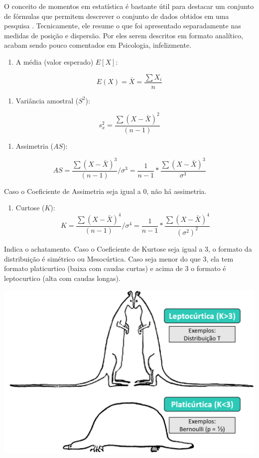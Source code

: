 \documentclass[
]{book}
\providecommand{\tightlist}{%
  \setlength{\itemsep}{0pt}\setlength{\parskip}{0pt}}
\begin{document}
O conceito de momentos em estatística é bastante útil para destacar um conjunto de fórmulas que permitem descrever o conjunto de dados obtidos em uma pesquisa \citep{JenkinsSmith2017}. Tecnicamente, ele resume o que foi apresentado separadamente nas medidas de posição e dispersão. Por eles serem descritos em formato analítico, acabam sendo pouco comentados em Psicologia, infelizmente.

\begin{enumerate}
\def\labelenumi{\arabic{enumi}.}
\tightlist
\item
  A média (valor esperado) \(E[X]\):
\end{enumerate}

\[E(X) = \bar{X}=\frac{\sum X_{i}}{n}\]

\begin{enumerate}
\def\labelenumi{\arabic{enumi}.}
\setcounter{enumi}{1}
\tightlist
\item
  Variância amostral (\(S^2\)):
\end{enumerate}

\[s^{2}_{x}=\frac{\sum (X-\bar{X})^{2}}{(n-1)}\]

\begin{enumerate}
\def\labelenumi{\arabic{enumi}.}
\setcounter{enumi}{2}
\tightlist
\item
  Assimetria (\(AS\)):
\end{enumerate}

\[AS = \frac{\sum (X-\bar{X})^{3}}{(n-1)}/\sigma^3 = \frac{1}{n-1} *\frac{\sum (X-\bar{X})^3}{\sigma^3}\]

Caso o Coeficiente de Assimetria seja igual a 0, não há assimetria.

\begin{enumerate}
\def\labelenumi{\arabic{enumi}.}
\setcounter{enumi}{3}
\tightlist
\item
  Curtose (\(K\)):\\
  \[K = \frac{\sum (X-\bar{X})^{4}}{(n-1)}/\sigma^4= \frac{1}{n-1} *\frac{\sum (X-\bar{X})^4}{({\sigma^2})^2}\]
\end{enumerate}

Indica o achatamento. Caso o Coeficiente de Kurtose seja igual a 3, o formato da distribuição é simétrico ou Mesocúrtica. Caso seja menor do que 3, ela tem formato platicurtico (baixa com caudas curtas) e acima de 3 o formato é leptocurtico (alta com caudas longas).

\includegraphics{./img/cap_desc_curtose.png}
\end{document}
